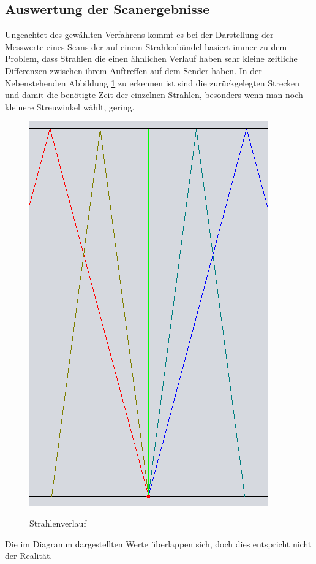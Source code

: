 \documentclass[12pt,a4paper]{scrartcl}
\begin{document}
\newpage
\subsection{Auswertung der Scanergebnisse}
Ungeachtet des gewählten Verfahrens kommt es bei der Darstellung der Messwerte eines Scans der auf einem Strahlenbündel basiert immer zu dem Problem, dass Strahlen die einen ähnlichen Verlauf haben sehr kleine zeitliche Differenzen zwischen ihrem Auftreffen auf dem Sender haben. 
In der Nebenstehenden Abbildung \ref{fig:Wegunterschied} zu erkennen ist sind die zurückgelegten Strecken und damit die benötigte Zeit der einzelnen Strahlen, besonders wenn man noch kleinere Streuwinkel wählt, gering.
\begin{figure}
\includegraphics[scale=0.25]{pictures/Strahlenbuendel.png}
\label{fig:Wegunterschied}
\caption{Strahlenverlauf}
\end{figure}
Die im Diagramm dargestellten Werte überlappen sich, doch dies entspricht nicht der Realität. 
\end{document}
